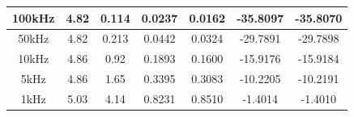 \documentclass[12pt]{article}
\begin{document}
\begin{table}[H]
\begin{tabular}{|c|c|c|c|c|c|c|}
100kHz    & 4.82                                                                 & 0.114                                                                       & 0.0237                                                                  & 0.0162                                                                              & -35.8097                                                                        & -35.8070                                                                                    \\ \hline
50kHz     & 4.82                                                                 & 0.213                                                                       & 0.0442                                                                  & 0.0324                                                                              & -29.7891                                                                        & -29.7898                                                                                    \\ \hline
10kHz     & 4.86                                                                 & 0.92                                                                        & 0.1893                                                                  & 0.1600                                                                              & -15.9176                                                                        & -15.9184                                                                                    \\ \hline
5kHz      & 4.86                                                                 & 1.65                                                                        & 0.3395                                                                  & 0.3083                                                                              & -10.2205                                                                        & -10.2191                                                                                    \\ \hline
1kHz      & 5.03                                                                 & 4.14                                                                        & 0.8231                                                                  & 0.8510                                                                              & -1.4014                                                                         & -1.4010                                                                                     \\ \hline

\end{tabular}
\end{table}
\end{document}
